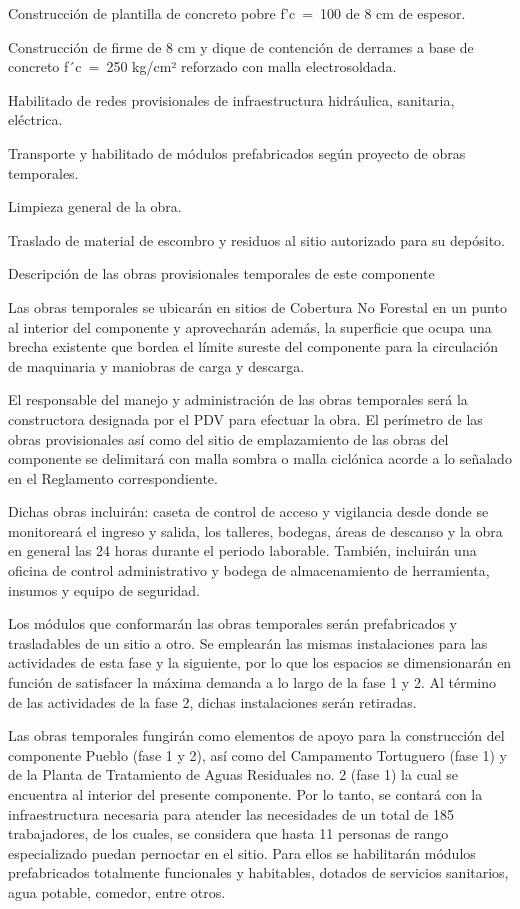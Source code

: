 \documentclass{article}
\begin{document}
Construcción de plantilla de concreto pobre f'c~=~100 de 8 cm de espesor.

Construcción de firme de 8 cm y dique de contención de derrames a base de concreto f´c~=~250 kg/cm² reforzado con malla electrosoldada.

Habilitado de redes provisionales de infraestructura hidráulica, sanitaria, eléctrica.

Transporte y habilitado de módulos prefabricados según proyecto de obras temporales.

Limpieza general de la obra.

Traslado de material de escombro y residuos al sitio autorizado para su depósito.


\bigskip


\bigskip

Descripción de las obras provisionales temporales de este componente


\bigskip

Las obras temporales se ubicarán en sitios de Cobertura No Forestal en un punto al interior del componente y aprovecharán además, la superficie que ocupa una brecha existente que bordea el límite sureste del componente para la circulación de maquinaria y maniobras de carga y descarga. 

El responsable del manejo y administración de las obras temporales será la constructora designada por el PDV para efectuar la obra. El perímetro de las obras provisionales así como del sitio de emplazamiento de las obras del componente se delimitará con malla sombra o malla ciclónica acorde a lo señalado en el Reglamento correspondiente.

Dichas obras incluirán: caseta de control de acceso y vigilancia desde donde se monitoreará el ingreso y salida, los talleres, bodegas, áreas de descanso y la obra en general las 24 horas durante el periodo laborable. También, incluirán una oficina de control administrativo y bodega de almacenamiento de herramienta, insumos y equipo de seguridad.

Los módulos que conformarán las obras temporales serán prefabricados y trasladables de un sitio a otro. Se emplearán las mismas instalaciones para las actividades de esta fase y la siguiente, por lo que los espacios se dimensionarán en función de satisfacer la máxima demanda a lo largo de la fase 1 y 2. Al término de las actividades de la fase 2, dichas instalaciones serán retiradas. 

Las obras temporales fungirán como elementos de apoyo para la construcción del componente Pueblo (fase 1 y 2), así como del Campamento Tortuguero (fase 1) y de la Planta de Tratamiento de Aguas Residuales no. 2 (fase 1) la cual se encuentra al interior del presente componente. Por lo tanto, se contará con la infraestructura necesaria para atender las necesidades de un total de 185 trabajadores, de los cuales, se considera que hasta 11 personas de rango especializado puedan pernoctar en el sitio. Para ellos se habilitarán módulos prefabricados totalmente funcionales y habitables, dotados de servicios sanitarios, agua potable, comedor, entre otros. 
\end{document}
